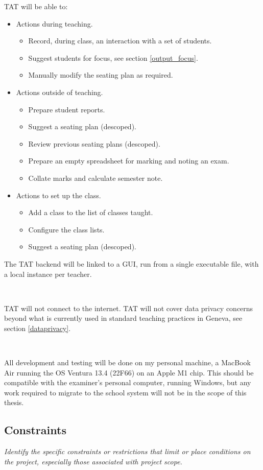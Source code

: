 \documentclass[10pt]{article}
\begin{document}
TAT will be able to:
\begin{itemize}
\item Actions during teaching.
\begin{itemize}
  \item Record, during class, an interaction with a set of students.
  \item Suggest students for focus, see section \ref{output_focus}.
  \item Manually modify the seating plan as required.
 \end{itemize}
 \item Actions outside of teaching.
 \begin{itemize}
  \item Prepare student reports.
  \item Suggest a seating plan (descoped). 
  \item Review previous seating plans (descoped).
  \item Prepare an empty spreadsheet for marking and noting an exam.
  \item Collate marks and calculate semester note.
\end{itemize}
\item Actions to set up the class.
\begin{itemize}
  \item Add a class to the list of classes taught.
  \item Configure the class lists.
  \item Suggest a seating plan (descoped).
\end{itemize}
\end{itemize}

The TAT backend will be linked to a GUI, run from a single executable file, with a local instance per teacher.

\

TAT will not connect to the internet. TAT will not cover data privacy concerns beyond what is currently used in standard teaching practices in Geneva, see section \ref{dataprivacy}.

\

All development and testing will be done on my personal machine, a MacBook Air running the OS Ventura 13.4 (22F66) on an Apple M1 chip. This should be compatible with the examiner's personal computer, running Windows, but any work required to migrate to the school system will not be in the scope of this thesis.

\subsection{Constraints} 
\emph{Identify the specific constraints or restrictions that limit or place conditions on the project, especially those associated with project scope.}
\end{document}
